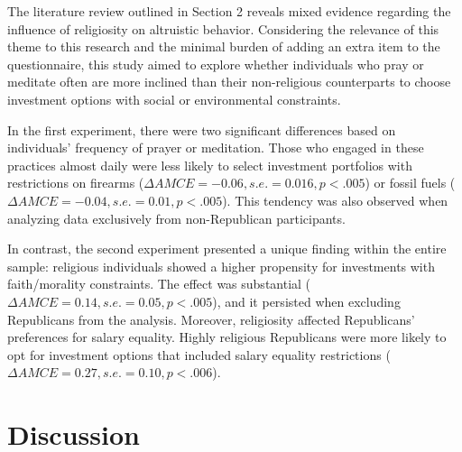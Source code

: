 \documentclass[
  12pt,
]{article}
\begin{document}
The literature review outlined in Section 2 reveals mixed evidence regarding the influence of religiosity on altruistic behavior. Considering the relevance of this theme to this research and the minimal burden of adding an extra item to the questionnaire, this study aimed to explore whether individuals who pray or meditate often are more inclined than their non-religious counterparts to choose investment options with social or environmental constraints.

In the first experiment, there were two significant differences based on individuals' frequency of prayer or meditation. Those who engaged in these practices almost daily were less likely to select investment portfolios with restrictions on firearms (\(\Delta AMCE = -0.06, s.e. = 0.016, p<.005\)) or fossil fuels (\(\Delta AMCE = -0.04, s.e. = 0.01, p<.005\)). This tendency was also observed when analyzing data exclusively from non-Republican participants.

In contrast, the second experiment presented a unique finding within the entire sample: religious individuals showed a higher propensity for investments with faith/morality constraints. The effect was substantial (\(\Delta AMCE = 0.14, s.e. = 0.05, p<.005\)), and it persisted when excluding Republicans from the analysis. Moreover, religiosity affected Republicans' preferences for salary equality. Highly religious Republicans were more likely to opt for investment options that included salary equality restrictions (\(\Delta AMCE = 0.27, s.e.=0.10, p<.006\)).

\hypertarget{discussion}{%
\section{Discussion}\label{discussion}}
\end{document}
